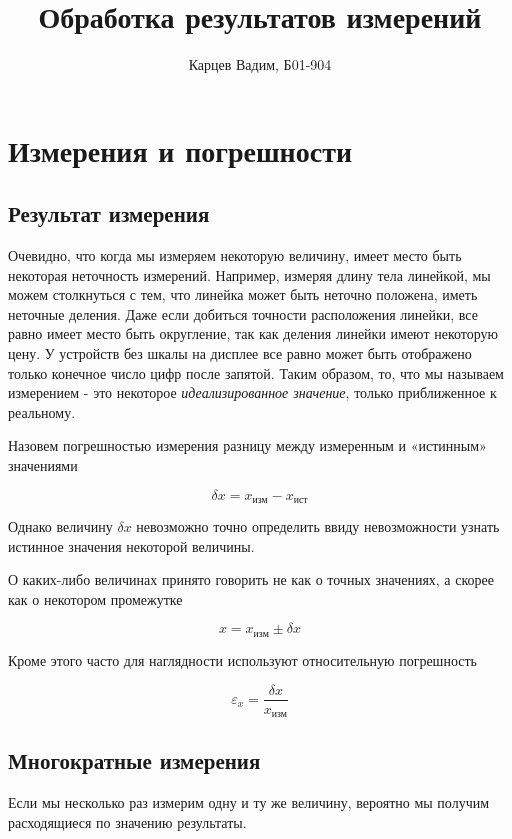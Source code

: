 \documentclass[12pt]{article}
\author{Карцев Вадим, Б01-904}            %
\title{Обработка результатов измерений}
\begin{document}
  \maketitle


  \section{Измерения и погрешности}

    \subsection{Результат измерения}

      Очевидно, что когда мы измеряем некоторую величину, имеет место быть некоторая
      неточность измерений. Например, измеряя длину тела линейкой, мы можем столкнуться
      с тем, что линейка может быть неточно положена, иметь неточные деления.
      Даже если добиться точности расположения линейки, все равно имеет место быть округление,
      так как деления линейки имеют некоторую цену. У устройств без шкалы на дисплее
      все равно может быть отображено только конечное число цифр после запятой.
      Таким образом, то, что мы называем измерением - это некоторое \textit{идеализированное значение},
      только приближенное к реальному.

      Назовем погрешностью измерения разницу между измеренным и «истинным» значениями

      $$
        \delta x = x_{изм} - x_{ист}
      $$

      Однако величину $\delta x$ невозможно точно определить ввиду невозможности
      узнать истинное значения некоторой величины.

      О каких-либо величинах принято говорить не как о точных значениях, а скорее
      как о некотором промежутке

      $$
        x = x_{изм} \pm \delta x
      $$

      Кроме этого часто для наглядности используют относительную погрешность

      $$
        \varepsilon_x = \frac{\delta x}{x_{изм}}
      $$

    \subsection{Многократные измерения}

      Если мы несколько раз измерим одну и ту же величину, вероятно мы получим
      расходящиеся по значению результаты.
\end{document}
